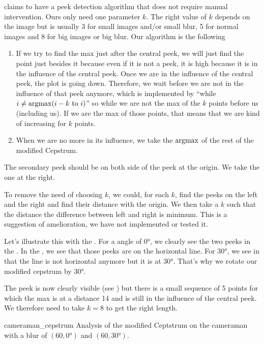 \cite{Deshpande2014606} claims to have a peek detection
algorithm that does not require manual intervention.
Ours only need one parameter $k$.
The right value of $k$ depends on the image but is
usually 3 for small images and/or small blur,
5 for normal images and 8 for big images or big blur.
Our algorithm is the following 
\begin{enumerate}
  \item If we try to find the max just after the central peek,
    we will just find the point just besides it because even
    if it is not a peek, it is high because it is in the
    influence of the central peek.
    Once we are in the influence of the central peek,
    the plot is going down.
    Therefore, we wait before we are not in the influence of that peek
    anymore, which is implemented by
    ``while $i \neq \operatorname{argmax}(i-k\text{ to }i)$'' so
    while we are not the max of the $k$ points before us
    (including us).
    If we are the max of those points,
    that means that we are kind of increasing for $k$
    points.
  \item When we are no more in its influence, we take the
    $\operatorname{argmax}$ of the rest of the modified Cepstrum.
\end{enumerate}

The secondary peek should be on both side of the peek at the
origin.
We take the one at the right.

To remove the need of choosing $k$, we could,
for each $k$, find the peeks on the left and the right and
find their distance with the origin.
We then take a $k$ such that the distance
the difference between left and right is minimum.
This is a suggestion of amelioration,
we have not implemented or tested it.

Let's illustrate this with the .
For a angle of \ang{0}, we clearly see the two peeks
in the .
In the ,
we see that those peeks are on the horizontal line.
For \ang{30}, we see in 
that the line is not horizontal anymore but it is at \ang{30}.
That's why we rotate our modified cepstrum by \ang{30}.

The peek is now clearly visible (see ) but
there is a small sequence of 5 points for which the max is at a distance
14 and is still in the influence of the central peek.
We therefore need to take $k = 8$ to get the right length.

\begin{myfig}{cameraman_cepstrum}
  {Analysis of the modified Ceptstrum on the cameraman with a blur of $(60,\ang{0})$ and $(60,\ang{30})$.}
\end{myfig}

